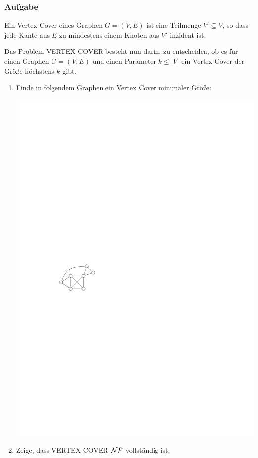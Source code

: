 \begin{frame}
\frametitle{Aufgabe}
Ein Vertex Cover eines Graphen $G=(V,E)$ ist eine Teilmenge $V'\subseteq V$, so
dass jede Kante aus $E$ zu mindestens einem Knoten aus $V'$ inzident ist.

Das Problem \textsc{VERTEX COVER} besteht nun darin, zu entscheiden, ob es
für einen Graphen $G=(V,E)$ und einen Parameter $k \leq |V|$ ein Vertex Cover
der Größe höchstens $k$ gibt.

\begin{enumerate}
	\item Finde in folgendem Graphen ein Vertex Cover minimaler Größe: 
	
		\begin{center}\includegraphics[scale=1.2]{images/tut7-graph}\end{center}
		
	\item Zeige, dass \textsc{VERTEX COVER} $\cal{NP}$-vollständig ist. 
\end{enumerate}
\end{frame}

